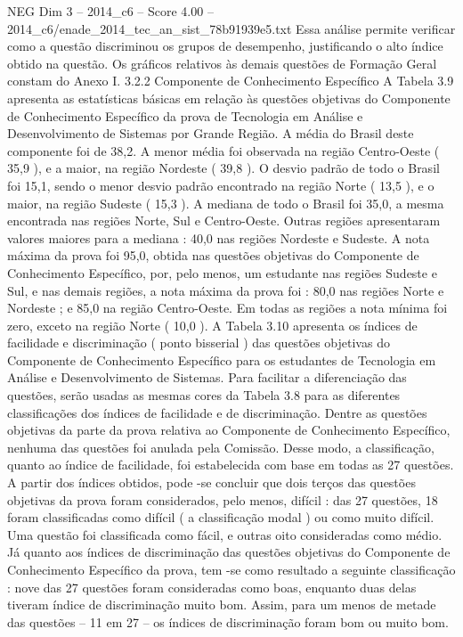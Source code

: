 \begin{textsample}{NEG Dim 3 – 2014\_c6 – Score 4.00 – 2014\_c6/enade\_2014\_tec\_an\_sist\_78b91939e5.txt}
Essa análise permite verificar como a questão discriminou os grupos de desempenho, justificando o alto índice obtido na questão.
Os gráficos relativos às demais questões de Formação Geral constam do Anexo I. 3.2.2 Componente de Conhecimento Específico A Tabela 3.9 apresenta as estatísticas básicas em relação às questões objetivas do Componente de Conhecimento Específico da prova de Tecnologia em Análise e Desenvolvimento de Sistemas por Grande Região.
A média do Brasil deste componente foi de 38,2.
A menor média foi observada na região Centro-Oeste ( 35,9 ), e a maior, na região Nordeste ( 39,8 ).
O desvio padrão de todo o Brasil foi 15,1, sendo o menor desvio padrão encontrado na região Norte ( 13,5 ), e o maior, na região Sudeste ( 15,3 ).
A mediana de todo o Brasil foi 35,0, a mesma encontrada nas regiões Norte, Sul e Centro-Oeste.
Outras regiões apresentaram valores maiores para a mediana : 40,0 nas regiões Nordeste e Sudeste.
A nota máxima da prova foi 95,0, obtida nas questões objetivas do Componente de Conhecimento Específico, por, pelo menos, um estudante nas regiões Sudeste e Sul, e nas demais regiões, a nota máxima da prova foi : 80,0 nas regiões Norte e Nordeste ; e 85,0 na região Centro-Oeste.
Em todas as regiões a nota mínima foi zero, exceto na região Norte ( 10,0 ).
A Tabela 3.10 apresenta os índices de facilidade e discriminação ( ponto bisserial ) das questões objetivas do Componente de Conhecimento Específico para os estudantes de Tecnologia em Análise e Desenvolvimento de Sistemas.
Para facilitar a diferenciação das questões, serão usadas as mesmas cores da Tabela 3.8 para as diferentes classificações dos índices de facilidade e de discriminação.
Dentre as questões objetivas da parte da prova relativa ao Componente de Conhecimento Específico, nenhuma das questões foi anulada pela Comissão.
Desse modo, a classificação, quanto ao índice de facilidade, foi estabelecida com base em todas as 27 questões.
A partir dos índices obtidos, pode -se concluir que dois terços das questões objetivas da prova foram considerados, pelo menos, difícil : das 27 questões, 18 foram classificadas como difícil ( a classificação modal ) ou como muito difícil.
Uma questão foi classificada como fácil, e outras oito consideradas como médio.
Já quanto aos índices de discriminação das questões objetivas do Componente de Conhecimento Específico da prova, tem -se como resultado a seguinte classificação : nove das 27 questões foram consideradas como boas, enquanto duas delas tiveram índice de discriminação muito bom.
Assim, para um menos de metade das questões – 11 em 27 – os índices de discriminação foram bom ou muito bom.

\end{textsample}
